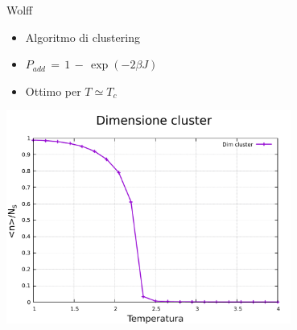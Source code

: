 \begin{frame}
\begin{columns}
\begin{column}{0.5\textwidth}
\begin{block}{Wolff}
                \begin{itemize}[itemsep=0.5em, label=$\diamond$]
                    \item Algoritmo di clustering
                    \item $P_{add}\,=\,1\,-\,\exp{\left(-2\beta J\right)}$
                    \item Ottimo per $T \simeq T_c$
                \end{itemize}

                \centering
                \includegraphics[width=0.7\textwidth]{Immagini/metodiNumerici/dimClFlip.pdf}			
            
            \end{block}
        \end{column}
      \end{columns}
  
\end{frame}



